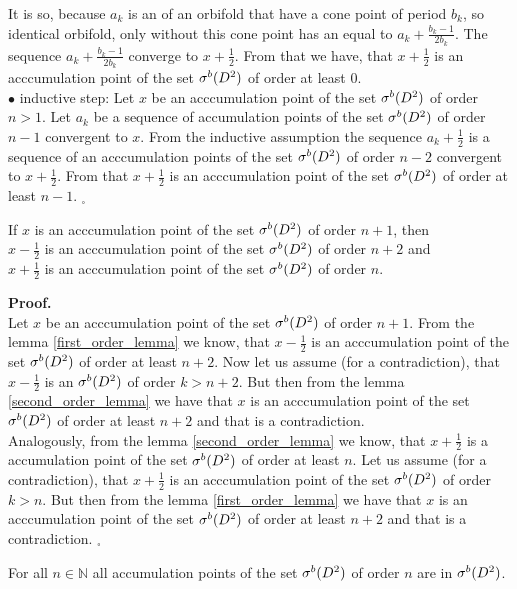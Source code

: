It is so, because $a_k$ is an \Eoc of an orbifold that have a cone point of period $b_k$, so 
identical orbifold, only without this cone point has an \Eoc equal to $a_k + \frac{b_k-1}{2b_k}$. 
The sequence $a_k + \frac{b_k-1}{2b_k}$ converge to $x+\frac{1}{2}$. From that we have, that 
$x + \frac{1}{2}$ is an acccumulation point of the set ${\mathcal{\sigma}^b(D^2)}$ of order at least $0$. \\
$\bullet$ inductive step: Let $x$ be an acccumulation point of the set ${\mathcal{\sigma}^b(D^2)}$ of order $n > 1$. 
Let $a_k$ be a sequence of accumulation points of the set ${\mathcal{\sigma}^b(D^2)}$ of order $n-1$ convergent to $x$. 
From the inductive assumption the sequence $a_k + \frac{1}{2}$ is a sequence of an acccumulation
 points of the set ${\mathcal{\sigma}^b(D^2)}$ of order $n-2$ convergent to $x + \frac{1}{2}$. From that 
 $x + \frac{1}{2}$ is an acccumulation point of the set ${\mathcal{\sigma}^b(D^2)}$ of order at least $n-1$. $_\square$ 
\begin{lemma}\label{third_order_lemma}
If $x$ is an acccumulation point of the set ${\mathcal{\sigma}^b(D^2)}$ of order $n+1$, then \\
$x - \frac{1}{2}$ is an acccumulation point of the set ${\mathcal{\sigma}^b(D^2)}$ of order $n+2$ and \\
$x + \frac{1}{2}$ is an acccumulation point of the set ${\mathcal{\sigma}^b(D^2)}$ of order $n$. 
\end{lemma}
\noindent\textbf{Proof.} \\
Let $x$ be an acccumulation point of the set ${\mathcal{\sigma}^b(D^2)}$ of order $n+1$. From the lemma 
 \ref{first_order_lemma} we know, that $x - \frac{1}{2}$ is an acccumulation point of the set 
 ${\mathcal{\sigma}^b(D^2)}$ of order at least $n+2$. Now let us assume (for a contradiction), that $x - \frac{1}{2}$ 
 is an \apots ${\mathcal{\sigma}^b(D^2)}$ of order $k>n+2$. But then from the lemma \ref{second_order_lemma} 
 we have that $x$ is an acccumulation point of the set ${\mathcal{\sigma}^b(D^2)}$ of order at least $n+2$ and that 
 is a contradiction. \\
Analogously, from the lemma \ref{second_order_lemma} we know, that $x + \frac{1}{2}$ is a 
accumulation point of the set ${\mathcal{\sigma}^b(D^2)}$ of order at least $n$. Let us assume (for a contradiction), 
that $x+ \frac{1}{2}$ is an acccumulation point of the set ${\mathcal{\sigma}^b(D^2)}$ of order $k>n$. But then 
from the lemma \ref{first_order_lemma} we have that $x$ is an acccumulation point of the set ${\mathcal{\sigma}^b(D^2)}$ 
of order at least $n+2$ and that is a contradiction. $_\square$ 
\begin{lemma}\label{accumulations_points_of_the_set}
For all $n \in \mathbb{N}$ all accumulation points of the set ${\mathcal{\sigma}^b(D^2)}$ of order $n$ are in ${\mathcal{\sigma}^b(D^2)}$.
\end{lemma}
